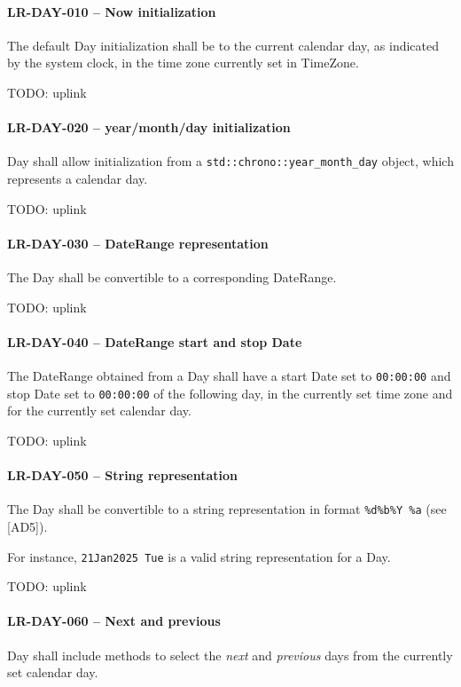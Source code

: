 \paragraph{LR-DAY-010 -- Now initialization}
The default Day initialization shall be to the current calendar day,
as indicated by the system clock, in the time zone currently set
in TimeZone.

TODO: uplink

\paragraph{LR-DAY-020 -- year/month/day initialization}
Day shall allow initialization from a \lstinline{std::chrono::year_month_day}
object, which represents a calendar day.

TODO: uplink

\paragraph{LR-DAY-030 -- DateRange representation}
The Day shall be convertible to a corresponding DateRange.

TODO: uplink

\paragraph{LR-DAY-040 -- DateRange start and stop Date}
The DateRange obtained from a Day shall have a start Date set
to \lstinline{00:00:00} and stop Date set to \lstinline{00:00:00} of the
following day, in the currently set time zone and for the currently set calendar
day.

TODO: uplink

\paragraph{LR-DAY-050 -- String representation}
The Day shall be convertible to a string representation in format
\lstinline{%d%b%Y %a} (see [AD5]).

For instance, \lstinline{21Jan2025 Tue} is a valid string representation
for a Day.

TODO: uplink

\paragraph{LR-DAY-060 -- Next and previous}
Day shall include methods to select the \emph{next} and \emph{previous} days
from the currently set calendar day.

